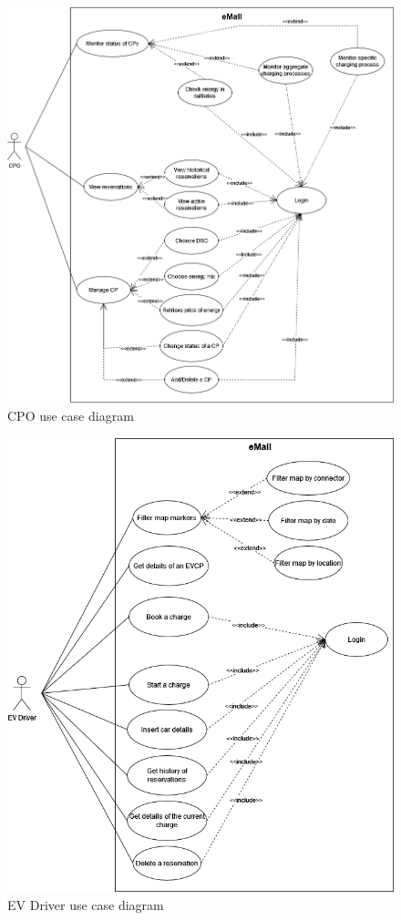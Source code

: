 \begin{figure}[p]
    \centering
    \includegraphics[scale=0.5]{src/use_case_diagram/cpo.png}
    \caption{CPO use case diagram}
\end{figure}

\begin{figure}[p]
    \centering
    \includegraphics[scale=0.6]{src/use_case_diagram/driver.png}
    \caption{EV Driver use case diagram}
\end{figure}


